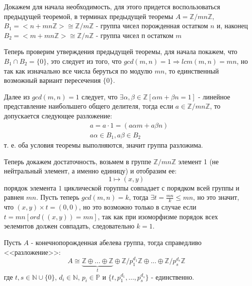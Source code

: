 \begin{Proof}
Докажем для начала необходимость, для этого придется воспользоваться предыдущей теоремой, в терминах предыдущей теоремы $A = \mathbb{Z} / {mn\mathbb{Z}}$, $B_1 = <n + mn \mathbb{Z}> \cong \mathbb{Z}/{m \mathbb{Z}}$ - группа чисел порожденная остатком $n$ и, наконец $B_2 = <m + mn \mathbb{Z}> \cong \mathbb{Z} / {n \mathbb{Z}}$ - группа чисел п остатком $m$

Теперь проверим утверждения предыдущей теоремы, для начала покажем, что $B_1 \cap B_2 = \{0\}$, это следует из того, что $gcd\left(m,n\right) = 1 \Rightarrow lcm\left(m,n\right) = mn$, но так как изначально все числа беруться по модулю $mn$, то единственный возможный вариант пересечения $\{0\}$.

Далее из $gcd\left(m,n\right) = 1$ следует, что $\exists \alpha, \beta \in \mathbb{Z} \left[\alpha m + \beta n = 1\right]$ - линейное представление наибольшего общего делителя, тогда если $a \in \mathbb{Z} / {mn \mathbb{Z}}$, то допускается следующее разложение:
\[
	\begin{split}
		& a = a \cdot 1 = \left(a \alpha m + a \beta n\right) \\
		& a \alpha \in B_1, a \beta \in B_2
	\end{split}
\]
т. е. оба условия теоремы выполняются, значит группа разложима.

Теперь докажем достаточность, возьмем в группе $\mathbb{Z} / {mn \mathbb{Z}}$ элемент 1 (не нейтральный элемент, а именно единицу) и отобразим ее:
\[
	1 \mapsto \left(x, y\right)
\]
порядок элемента $1$ циклической горуппы совпадает с порядком всей группы и равнен $mn$. Пусть теперь $gcd\left(m,n\right) = k$, тогда $\exists t = \frac{mn}{k} \le mn$, но это значит, что $\left(x,y\right) \times t = \left(0,0\right)$, но это возможно только в случае если $t = mn \left[ ord\left(\left(x,y\right)\right) = mn \right]$, так как при изоморфизме порядок всех эелемнтов должен совпадать, следовательно $k=1$.
\end{Proof}

\begin{Th}
Пусть $A$ - конечнопорожденная абелева группа, тогда справедливо <<разложение>>:
\[
	A \cong \underbrace{\mathbb{Z} \oplus ... \oplus \mathbb{Z}}_{t} \oplus \mathbb{Z} / {p_1^{d_1} \mathbb{Z}} \oplus ... \oplus \mathbb{Z} / {p_s^{d_s} \mathbb{Z}}
\]
где $t,s \in \mathbb{N} \cup \{0\}$, $d_i \in \mathbb{N}$, $p_i \in \mathbb{P}$ и $\{t, p_1^{d_1}, ... ,p_s^{d_s}\}$ - единственно.
\end{Th}

